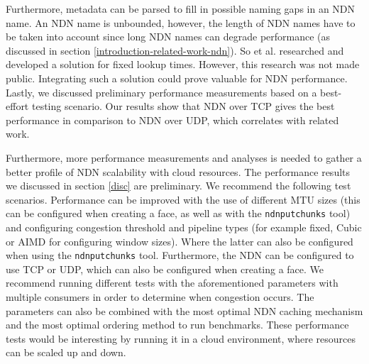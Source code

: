 Furthermore, metadata can be parsed to fill in possible naming gaps in an NDN name. An NDN name is unbounded, however, the length of NDN names have to be taken into account since long NDN names can degrade performance (as discussed in section \ref{introduction-related-work-ndn}). So et al. researched and developed a solution for fixed lookup times. However, this research was not made public. Integrating such a solution could prove valuable for NDN performance. Lastly, we discussed preliminary performance measurements based on a best-effort testing scenario. Our results show that NDN over TCP gives the best performance in comparison to NDN over UDP, which correlates with related work.

Furthermore, more performance measurements and analyses is needed to gather a better profile of NDN scalability with cloud resources. The performance results we discussed in section \ref{disc} are preliminary. We recommend the following test scenarios. Performance can be improved with the use of different MTU sizes (this can be configured when creating a face, as well as with the \texttt{ndnputchunks} tool) and configuring congestion threshold and pipeline types (for example fixed, Cubic or AIMD for configuring window sizes). Where the latter can also be configured when using the \texttt{ndnputchunks} tool. Furthermore, the NDN can be configured to use TCP or UDP, which can also be configured when creating a face. We recommend running different tests with the aforementioned parameters with multiple consumers in order to determine when congestion occurs. The parameters can also be combined with the most optimal NDN caching mechanism and the most optimal ordering method \cite{koulouzis2018information} to run benchmarks. These performance tests would be interesting by running it in a cloud environment, where resources can be scaled up and down.



